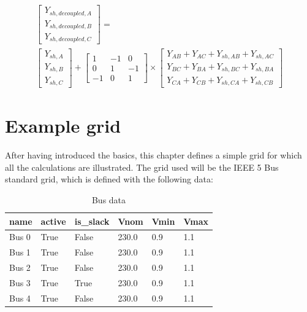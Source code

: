 \documentclass[nols,a4paper,twoside,notoc,fleqn]{tufte-book}
\begin{document}
\begin{equation}
	\begin{split}
		\left[ \begin{array}{c}
		Y_{sh, decoupled, A} \\
		Y_{sh, decoupled, B} \\
		Y_{sh, decoupled, C}
		\end{array} \right] =\\ \left[ \begin{array}{c}
		Y_{sh,A} \\
		Y_{sh,B} \\
		Y_{sh,C}
		\end{array} \right] + \left[ \begin{array}{ccc}
		1 & -1 & 0 \\
		0 & 1 & -1 \\
		-1 & 0 & 1
		\end{array} \right] \times \left[ \begin{array}{c}
		Y_{AB} + Y_{AC} + Y_{sh,AB} + Y_{sh,AC} \\
		Y_{BC} + Y_{BA} + Y_{sh,BC} + Y_{sh,BA}\\
		Y_{CA} + Y_{CB} + Y_{sh,CA} + Y_{sh,CB}
		\end{array} \right]
	\end{split}
\end{equation}

\chapter{Example grid}

After having introduced the basics, this chapter defines a simple grid for which all the calculations are illustrated. The grid used will be the IEEE 5 Bus standard grid, which is defined with the following data:

\begin{table}[h!]
	\color{gray}
	\begin{tabular}{|l|l|l|l|l|l|}
		\hline
		name  & active & is\_slack & Vnom  & Vmin & Vmax \\ \hline
		Bus 0 & True   & False     & 230.0 & 0.9  & 1.1  \\ \hline
		Bus 1 & True   & False     & 230.0 & 0.9  & 1.1  \\ \hline
		Bus 2 & True   & False     & 230.0 & 0.9  & 1.1  \\ \hline
		Bus 3 & True   & True      & 230.0 & 0.9  & 1.1  \\ \hline
		Bus 4 & True   & False     & 230.0 & 0.9  & 1.1  \\ \hline
	\end{tabular}
\caption{Bus data}
\label{tbl:IEEE5:bus_data}
\end{table}
\end{document}
